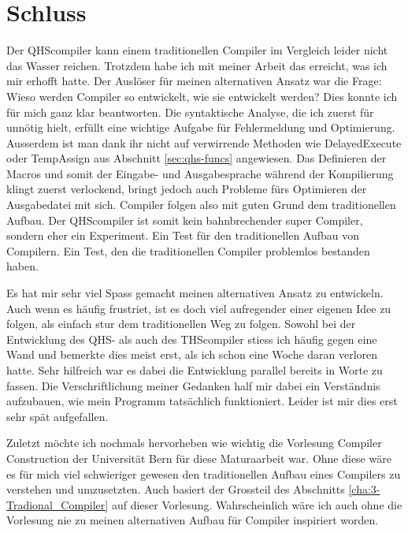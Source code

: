 \chapter{Schluss}
Der QHScompiler kann einem traditionellen Compiler im Vergleich leider nicht das Wasser reichen.
Trotzdem habe ich mit meiner Arbeit das erreicht, was ich mir erhofft hatte. Der Auslöser für meinen alternativen Ansatz war die Frage: Wieso werden Compiler so entwickelt, wie sie entwickelt werden? 
Dies konnte ich für mich ganz klar beantworten. Die syntaktische Analyse, die ich zuerst für unnötig hielt, erfüllt eine wichtige Aufgabe für Fehlermeldung und Optimierung.
Ausserdem ist man dank ihr nicht auf verwirrende Methoden wie DelayedExecute oder TempAssign aus Abschnitt \ref{sec:qhs-funcs} angewiesen.
Das Definieren der Macros und somit der Eingabe- und Ausgabesprache während der Kompilierung klingt zuerst verlockend, bringt jedoch auch Probleme fürs Optimieren der Ausgabedatei mit sich.
Compiler folgen also mit guten Grund dem traditionellen Aufbau.
Der QHScompiler ist somit kein bahnbrechender super Compiler, sondern eher ein Experiment.
Ein Test für den traditionellen Aufbau von Compilern. Ein Test, den die traditionellen Compiler problemlos bestanden haben.

Es hat mir sehr viel Spass gemacht meinen alternativen Ansatz zu entwickeln. Auch wenn es häufig frustriet, ist es doch viel aufregender einer eigenen Idee zu folgen, als einfach stur dem traditionellen Weg zu folgen.
Sowohl bei der Entwicklung des QHS- als auch des THScompiler stiess ich häufig gegen eine Wand und bemerkte dies meist erst, als ich schon eine Woche daran verloren hatte.
Sehr hilfreich war es dabei die Entwicklung parallel bereits in Worte zu fassen. Die Verschriftlichung meiner Gedanken half mir dabei ein Verständnis aufzubauen, wie mein Programm tatsächlich funktioniert.
Leider ist mir dies erst sehr spät aufgefallen.

Zuletzt möchte ich nochmals hervorheben wie wichtig die Vorlesung Compiler Construction der Universität Bern für diese Maturaarbeit war.
Ohne diese wäre es für mich viel schwieriger gewesen den traditionellen Aufbau eines Compilers zu verstehen und umzusetzten.
Auch basiert der Grossteil des Abschnitts \ref{cha:3-Tradional_Compiler} auf dieser Vorlesung.
Wahrscheinlich wäre ich auch ohne die Vorlesung nie zu meinen alternativen Aufbau für Compiler inspiriert worden.
